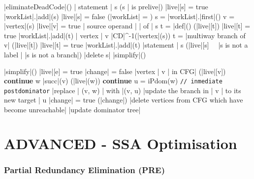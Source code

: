 \documentclass[a4paper,12pt, notitlepage]{article}
\begin{document}
\begin{program}
\PROC |eliminateDeadCode|() \BODY
    \FOREACH | statement | s \DO
        \IF (s | is prelive|) \AR*
            |live|[s] = true
            |workList|.|add|(s)
        \ELSE
            |live|[s] = false
        \FI
    \OD
    \WHILE (|workList| \not= \emptyset) \DO
        s = |workList|.|first|()
        v = |vertex|(s)
        |live|[v] = true
        \FOREACH | source operand | \omega | of | s \DO
            t = |def|(\omega)
            \IF (\neg |live|[t]) \AR*
                |live|[t] = true
                |workList|.|add|(t)
            \FI
        \OD
        \FOREACH | vertex | v \in |CD|^{-1}(|vertex|(s)) \DO
            t = |multiway branch of v|
            \IF (\neg |live|[t]) \AR*
                |live|[t] = true
                |workList|.|add|(t)
            \FI
        \OD
    \OD
    \FOREACH |statement | s \DO
        \IF (\neg|live|[s] \ \land \ |s is not a label | \land |s is not a branch|) \AR*
            |delete s|
        \FI
    \OD
    |simplify|()
\end{program}
\pagebreak
\begin{program}
\PROC |simplify|() \BODY
    |live|[e] = true
    |change| = false
    \FOREACH |vertex | v | in CFG| \DO
        \IF (\neg |live|[v]) \AR*
            \textbf{continue}
        \FI
        \FOREACH w \in |succ|(v) \DO
            \IF (|live|(w)) \AR*
                \textbf{continue}
            \FI
            u = iPdom(w) \texttt{// inmediate postdominator}
            |replace | (v, w) | with |(v, u)
            |update the branch in | v | to its new target | u
            |change| = true
        \OD
    \OD
    \IF (|change|) \AR*
        |delete vertices from CFG which have become unreachable|
        |update dominator tree|
    \FI
\end{program}

\pagebreak
\section*{ADVANCED - SSA Optimisation}
\subsubsection*{Partial Redundancy Elimination (PRE)}
\end{document}
